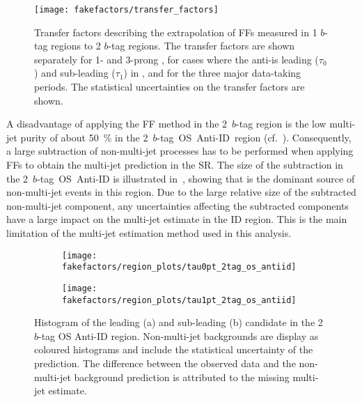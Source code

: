 \begin{figure}[htbp]
  \centering

  \texttt{[image: fakefactors/transfer\_factors]}

  \caption{Transfer factors describing the extrapolation of FFs measured in 1
    $b$-tag regions to 2 $b$-tag regions. The transfer factors are shown
    separately for 1- and 3-prong \tauhadvis, for cases where the
    anti-\tauhadvis is leading ($\tau_0$) and sub-leading ($\tau_1$) in \pT, and
    for the three major data-taking periods.  The statistical uncertainties on
    the transfer factors are shown.}%
  \label{fig:mjfakes_transfer_factor}
\end{figure}

A disadvantage of applying the FF method in the 2~$b$-tag region is the low
multi-jet purity of about \SI{50}{\percent} in the 2~$b$-tag~OS~Anti-ID~region
(cf.\ ). Consequently, a large subtraction of
non-multi-jet processes has to be performed when applying FFs to obtain the
multi-jet prediction in the SR.  The size of the subtraction in the
2~$b$-tag~OS~Anti-ID is illustrated in~,
showing that \ttbarFakes is the dominant source of non-multi-jet events in this
region. Due to the large relative size of the subtracted non-multi-jet
component, any uncertainties affecting the subtracted components have a large
impact on the multi-jet estimate in the ID region. This is the main limitation
of the multi-jet estimation method used in this analysis.

\begin{figure}[htbp]
  \centering

  \begin{subfigure}{0.49\textwidth}
    \texttt{[image: fakefactors/region\_plots/tau0pt\_2tag\_os\_antiid]}
    \subcaption{}
  \end{subfigure}%
  \begin{subfigure}{0.49\textwidth}
    \texttt{[image: fakefactors/region\_plots/tau1pt\_2tag\_os\_antiid]}
    \subcaption{}
  \end{subfigure}

  \caption{Histogram of the leading (a) and sub-leading (b) \tauhadvis candidate
    \pT in the 2 $b$-tag OS Anti-ID region. Non-multi-jet backgrounds are
    display as coloured histograms and include the statistical uncertainty of
    the prediction. The difference between the observed data and the
    non-multi-jet background prediction is attributed to the missing multi-jet
    estimate.}%
  \label{fig:mjfakes_2tag_os_antiid}
\end{figure}


